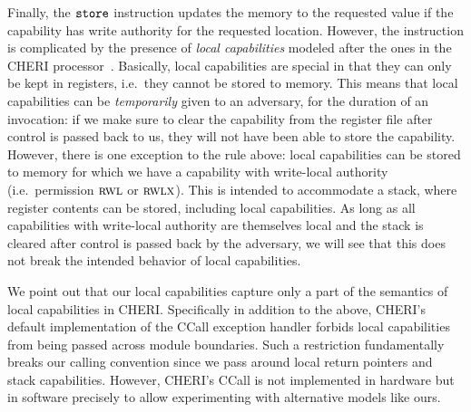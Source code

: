 \documentclass[format=acmsmall, review=true, screen=true]{acmart}
\newcommand\dominique[1]{{\color{purple} \sf \footnotesize {DD: #1}}\\}
\renewcommand\dominique[1]{}
\newcommand{\zinstr}[1]{\mathtt{#1}}
\newcommand{\twoinstr}[3]{
  \ifthenelse{\equal{#2#3}{}}
  {\zinstr{#1}}
  {\zinstr{#1} \; #2 \; #3}
}
\newcommand{\store}[2]{\twoinstr{store}{#1}{#2}}
\newcommand{\plainperm}[1]{\textsc{#1}}
\newcommand{\readwritel}{\plainperm{rwl}}
\newcommand{\rwl}{\readwritel}
\newcommand{\rwlx}{\plainperm{rwlx}}
\begin{document}
Finally, the $\store{}{}$ instruction updates the memory to the requested value
if the capability has write authority for the requested location. However, the
instruction is complicated by the presence of \emph{local capabilities} modeled
after the ones in the CHERI processor~\citep{Watson2015Cheri}. Basically, local
capabilities are special in that they can only be kept in registers, i.e.\ they
cannot be stored to memory. This means that local capabilities can be
\emph{temporarily} given to an adversary, for the duration of an invocation: if
we make sure to clear the capability from the register file after control is
passed back to us, they will not have been able to store the capability.
However, there is one exception to the rule above: local capabilities can be
stored to memory for which we have a capability with write-local authority
(i.e.\ permission $\rwl$ or $\rwlx$). This is intended to accommodate a stack,
where register contents can be stored, including local capabilities. As long as
all capabilities with write-local authority are themselves local and the stack
is cleared after control is passed back by the adversary, we will see that this
does not break the intended behavior of local capabilities.

We point out that our local capabilities capture only a part of the semantics of
local capabilities in CHERI. Specifically in addition to the above, CHERI's
default implementation of the CCall exception handler forbids local capabilities
from being passed across module boundaries. Such a restriction fundamentally
breaks our calling convention since we pass around local return pointers and
stack capabilities. However, CHERI's CCall is not implemented in hardware but
in software precisely to allow experimenting with alternative models like ours.
\dominique{Update to CHERI's new ccall story.}

\end{document}
